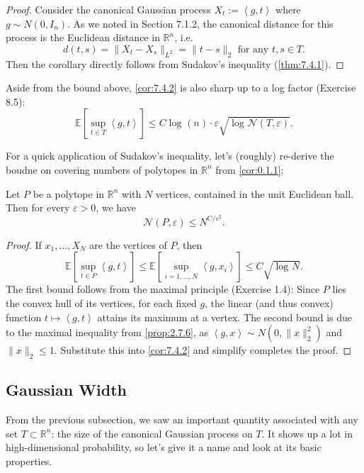 \begin{proof}
Consider the canonical Gaussian process $X_t := \left\langle g, t \right\rangle$ where $g \sim N(0, I_n)$. As 
we noted in Section 7.1.2, the canonical distance for this process is the Euclidean distance in $\mathbb{R}^n$, 
i.e. 
\[ d(t, s) = \lVert X_t - X_s \rVert_{L^2} = \lVert t - s \rVert_{2} \text{ for any } t, s \in T. \]
Then the corollary directly follows from Sudakov's inequality (\cref{thm:7.4.1}).
\end{proof}

Aside from the bound above, \cref{cor:7.4.2} is also sharp up to a log factor (Exercise 8.5): 
\[ \mathbb{E}\left[ \sup_{t \in T}\left\langle g, t \right\rangle \right] 
\leq C \log_{}{(n)} \cdot \varepsilon \sqrt{\log_{}{\mathcal{N}(T, \varepsilon)}}. \]

For a quick application of Sudakov's inequality, let's (roughly) re-derive the boudne on covering numbers of 
polytopes in $\mathbb{R}^n$ from \cref{cor:0.1.1}: 

\begin{corollary}
\label{cor:7.4.3}
Let $P$ be a polytope in $\mathbb{R}^n$ with $N$ vertices, contained in the unit Euclidean ball. Then for 
every $\varepsilon > 0$, we have
\[ \mathcal{N}(P, \varepsilon) \leq N^{C / \varepsilon^2}. \]
\end{corollary}

\begin{proof}
If $x_1, \dots, X_N$ are the vertices of $P$, then 
\[ \mathbb{E}\left[ \sup_{t \in P}\left\langle g, t \right\rangle \right] 
\leq \mathbb{E}\left[ \sup_{i = 1, \dots, N}\left\langle g, x_i \right\rangle \right] \leq 
C \sqrt{\log_{}{N}}. \]
The first bound follows from the maximal principle (Exercise 1.4): Since $P$ lies the convex hull of its 
vertices, for each fixed $g$, the linear (and thus convex) function $t \mapsto \left\langle g, t \right\rangle$ 
attains its maximum at a vertex. The second bound is due to the maximal inequality from \cref{prop:2.7.6}, 
as $\left\langle g, x \right\rangle \sim N(0, \lVert x \rVert_{2}^2)$ and $\lVert x \rVert_{2} \leq 1$. 
Substitute this into \cref{cor:7.4.2} and simplify completes the proof.
\end{proof}



\subsection{Gaussian Width}
From the previous subsection, we saw an important quantity associated with any set $T \subset \mathbb{R}^n$: 
the size of the canonical Gaussian process on $T$. It shows up a lot in high-dimensional probability, so 
let's give it a name and look at its basic properties.

